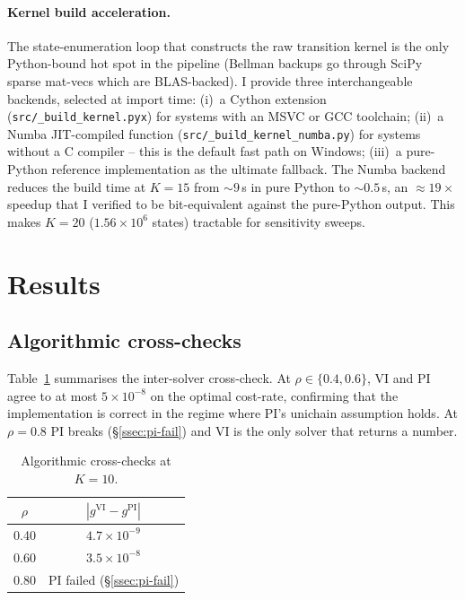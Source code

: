 \documentclass[11pt,a4paper]{article}
\begin{document}
\paragraph{Kernel build acceleration.}
The state-enumeration loop that constructs the raw transition kernel
is the only Python-bound hot spot in the pipeline (Bellman backups
go through SciPy sparse mat-vecs which are BLAS-backed). I provide
three interchangeable backends, selected at import time:
(i)~a Cython extension (\texttt{src/\_build\_kernel.pyx}) for systems
with an MSVC or GCC toolchain;
(ii)~a Numba JIT-compiled function
(\texttt{src/\_build\_kernel\_numba.py}) for systems without a C
compiler -- this is the default fast path on Windows;
(iii)~a pure-Python reference implementation as the ultimate fallback.
The Numba backend reduces the build time at $K = 15$ from
$\sim 9$\,s in pure Python to $\sim 0.5$\,s, an $\approx 19\times$
speedup that I verified to be bit-equivalent against the pure-Python
output. This makes $K = 20$ ($1.56 \times 10^6$ states) tractable for
sensitivity sweeps.

\section{Results}
\label{sec:results}

\subsection{Algorithmic cross-checks}

Table~\ref{tab:cross} summarises the inter-solver cross-check.
At $\rho \in \{0.4, 0.6\}$, VI and PI agree to at most $5 \times
10^{-8}$ on the optimal cost-rate, confirming that the implementation
is correct in the regime where PI's unichain assumption holds. At
$\rho = 0.8$ PI breaks (\S\ref{ssec:pi-fail}) and VI is the only
solver that returns a number.

\begin{table}[h]
\centering
\caption{Algorithmic cross-checks at $K = 10$.}
\label{tab:cross}
\begin{tabular}{cc}
\toprule
$\rho$ & $|g^{\mathrm{VI}} - g^{\mathrm{PI}}|$ \\
\midrule
0.40 & $4.7 \times 10^{-9}$ \\
0.60 & $3.5 \times 10^{-8}$ \\
0.80 & PI failed (\S\ref{ssec:pi-fail}) \\
\bottomrule
\end{tabular}
\end{table}
\end{document}
